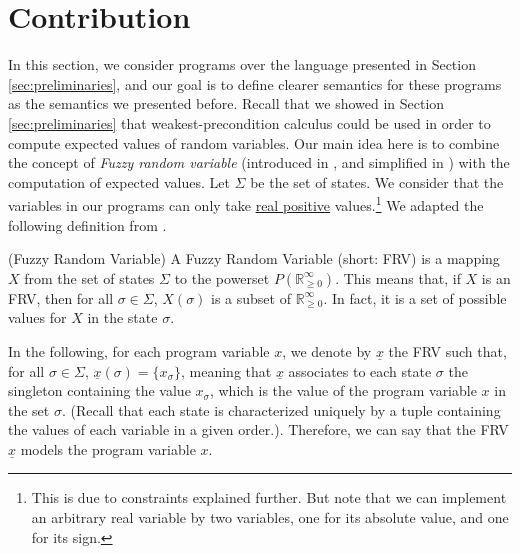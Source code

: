 \documentclass[a4paper,10pt]{llncs}
\def\RRposi {{\mathbb R_{\geq 0}^{\infty}}}
\begin{document}
\section{Contribution}
\label{sec:contribution}

In this section, we consider programs over the language presented in Section \ref{sec:preliminaries}, and our goal is to define clearer semantics for these programs as the semantics we presented before. Recall that we showed in Section \ref{sec:preliminaries} that weakest-precondition calculus could be used in order to compute expected values of random variables. Our main idea here is to combine the concept of \textit{Fuzzy random variable} (introduced in \cite{PuriRal86}, and simplified in \cite{Shapiro09}) with the computation of expected values.\newline
Let $\Sigma$ be the set of states. We consider that the variables in our programs can only take \underline{real positive} values.\footnote{This is due to constraints explained further. But note that we can implement an arbitrary real variable by two variables, one for its absolute value, and one for its sign.} We adapted the following definition from \cite{PuriRal86}.

\begin{definition}{\textnormal{(Fuzzy Random Variable)\newline}}
 A Fuzzy Random Variable (short: FRV) is a mapping $X$ from the set of states $\Sigma$ to the powerset $P(\RRposi)$. This means that, if $X$ is an FRV, then for all $\sigma \in \Sigma$, $X(\sigma)$ is a subset of $\RRposi$. In fact, it is a set of possible values for $X$ in the state $\sigma$.
\end{definition}
\begin{example}
 In the following, for each program variable $x$, we denote by $\underline{x}$ the FRV such that, for all $\sigma \in \Sigma$, $\underline{x}(\sigma) = \{ x_{\sigma} \}$, meaning that $\underline{x}$ associates to each state $\sigma$ the singleton containing the value $x_\sigma$, which is the value of the program variable $x$ in the set $\sigma$. (Recall that each state is characterized uniquely by a tuple containing the values of each variable in a given order.). Therefore, we can say that the FRV $\underline{x}$ models the program variable $x$.
\end{example}
\end{document}
